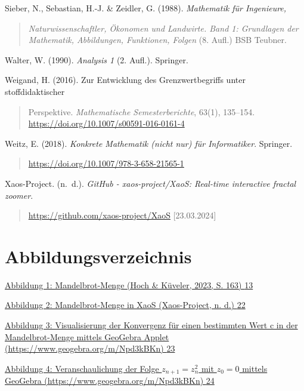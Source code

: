 \documentclass[a4paper, 12pt]{book}
\begin{document}
Sieber, N., Sebastian, H.-J. \& Zeidler, G. (1988). \emph{Mathematik für
Ingenieure,}

\begin{quote}
\emph{Naturwissenschaftler, Ökonomen und Landwirte. Band 1: Grundlagen
der Mathematik, Abbildungen, Funktionen, Folgen} (8. Aufl.) BSB Teubner.
\end{quote}

Walter, W. (1990). \emph{Analysis 1} (2. Aufl.). Springer.

Weigand, H. (2016). Zur Entwicklung des Grenzwertbegriffs unter
stoffdidaktischer

\begin{quote}
Perspektive. \emph{Mathematische Semesterberichte}, 63(1), 135--154.
\url{https://doi.org/10.1007/s00591-016-0161-4}
\end{quote}

Weitz, E. (2018). \emph{Konkrete Mathematik (nicht nur) für
Informatiker}. Springer.

\begin{quote}
\url{https://doi.org/10.1007/978-3-658-21565-1}
\end{quote}

Xaos-Project. (n.~d.). \emph{GitHub - xaos-project/XaoS: Real-time
interactive fractal zoomer}.

\begin{quote}
\url{https://github.com/xaos-project/XaoS} {[}23.03.2024{]}
\end{quote}

\section{Abbildungsverzeichnis}\label{abbildungsverzeichnis}

\protect\hyperlink{_Toc167901651}{Abbildung 1: Mandelbrot-Menge (Hoch \&
Küveler, 2023, S. 163) \protect\hyperlink{_Toc167901651}{13}}

\protect\hyperlink{_Toc167901652}{Abbildung 2: Mandelbrot-Menge in XaoS
(Xaos-Project, n. d.) \protect\hyperlink{_Toc167901652}{22}}

\protect\hyperlink{_Toc167901653}{Abbildung 3: Visualisierung der
Konvergenz für einen bestimmten Wert c in der Mandelbrot-Menge mittels
GeoGebra Applet (https://www.geogebra.org/m/Npd3kBKn)
\protect\hyperlink{_Toc167901653}{23}}

\protect\hyperlink{_Toc167901654}{Abbildung 4: Veranschaulichung der
Folge \(z_{n + 1} = z_{n}^{2}\) mit \(z_{0} = 0\) mittels
GeoGebra (https://www.geogebra.org/m/Npd3kBKn)
\protect\hyperlink{_Toc167901654}{24}}
\end{document}
